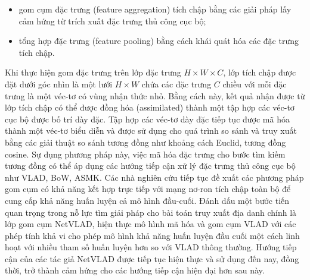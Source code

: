 \begin{itemize}
    \item gom cụm đặc trưng (feature aggregation) tích chập bằng các giải pháp lấy cảm hứng từ trích xuất đặc trưng thủ công cục bộ;
    \item tổng hợp đặc trưng (feature pooling) bằng cách khái quát hóa các đặc trưng tích chập.
\end{itemize}

Khi thực hiện gom đặc trưng trên lớp đặc trưng \(H \times W \times C\), lớp tích chập được đặt dưới góc nhìn là một lưới \(H \times W \) chứa các đặc trưng \(C\) chiều với mỗi đặc trưng là một véc-tơ có vùng nhận thức nhỏ. Bằng cách này, kết quả nhận được từ lớp tích chập có thể được đồng hóa (assimilated) thành một tập hợp các véc-tơ cục bộ được bố trí dày đặc. Tập hợp các véc-tơ dày đặc tiếp tục được mã hóa thành một véc-tơ biểu diễn và được sử dụng cho quá trình so sánh và truy xuất bằng các giải thuật so sánh tương đồng như khoảng cách Euclid, tương đồng cosine. Sự dụng phương pháp này, việc mã hóa đặc trưng cho bước tìm kiếm tương đồng có thể áp dụng các hướng tiếp cận xử lý đặc trưng thủ công cục bộ như VLAD\cite{vlad}, BoW\cite{Mohedano_2016}, ASMK\cite{cao2020unifying}. Các nhà nghiên cứu tiếp tục đề xuất các phương pháp gom cụm có khả năng kết hợp trực tiếp với mạng nơ-ron tích chập toàn bộ để cung cấp khả năng huấn luyện cả mô hình đầu-cuối\cite{ong2017siamese}. Đánh dấu một bước tiến quan trọng trong nỗ lực tìm giải pháp cho bài toán truy xuất địa danh chính là lớp gom cụm NetVLAD\cite{arandjelović2016netvlad}, hiện thực mô hình mã hóa và gom cụm VLAD với các phép tính khả vi cho phép mô hình khả năng huấn luyện đầu cuối một cách linh hoạt với nhiều tham số huấn luyện hơn so với VLAD thông thường. Hướng tiếp cận của các tác giả NetVLAD được tiếp tục hiện thực và sử dụng đến nay, đồng thời, trở thành cảm hứng cho các hướng tiếp cận hiện đại hơn sau này.

